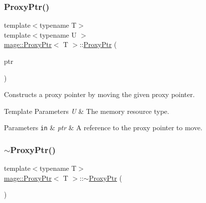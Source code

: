 \subsubsection{\texorpdfstring{Proxy\+Ptr()}{ProxyPtr()}\hspace{0.1cm}{\footnotesize\ttfamily [8/8]}}
{\footnotesize\ttfamily template$<$typename T$>$ \\
template$<$typename U $>$ \\
\mbox{\hyperlink{classmage_1_1_proxy_ptr}{mage\+::\+Proxy\+Ptr}}$<$ T $>$\+::\mbox{\hyperlink{classmage_1_1_proxy_ptr}{Proxy\+Ptr}} (\begin{DoxyParamCaption}\item[{\mbox{\hyperlink{classmage_1_1_proxy_ptr}{Proxy\+Ptr}}$<$ U $>$ \&\&}]{ptr }\end{DoxyParamCaption})\hspace{0.3cm}{\ttfamily [noexcept]}}

Constructs a proxy pointer by moving the given proxy pointer.


\begin{DoxyTemplParams}{Template Parameters}
{\em U} & The memory resource type. \\
\hline
\end{DoxyTemplParams}

\begin{DoxyParams}[1]{Parameters}
\mbox{\tt in}  & {\em ptr} & A reference to the proxy pointer to move. \\
\hline
\end{DoxyParams}
\mbox{\label{classmage_1_1_proxy_ptr_a7f8989f9214bbc1cd94295c796cfbb9a}} 
\subsubsection{\texorpdfstring{$\sim$\+Proxy\+Ptr()}{~ProxyPtr()}}
{\footnotesize\ttfamily template$<$typename T$>$ \\
\mbox{\hyperlink{classmage_1_1_proxy_ptr}{mage\+::\+Proxy\+Ptr}}$<$ T $>$\+::$\sim$\mbox{\hyperlink{classmage_1_1_proxy_ptr}{Proxy\+Ptr}} (\begin{DoxyParamCaption}{ }\end{DoxyParamCaption})\hspace{0.3cm}{\ttfamily [default]}}

